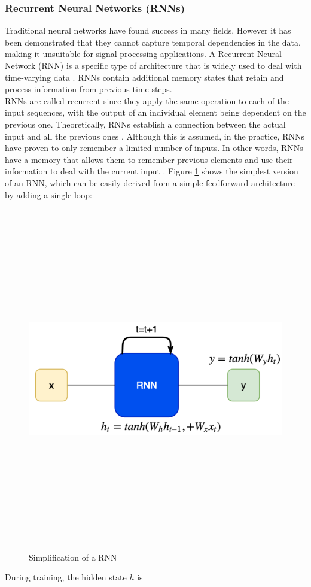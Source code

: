  \subsubsection{Recurrent Neural Networks (RNNs)}
 Traditional neural networks have found success in many fields, However
 it has been demonstrated that they cannot capture
 temporal dependencies in the data, making it unsuitable for signal processing applications. A Recurrent Neural Network (RNN) is a specific type of architecture that is 
 widely used to deal with time-varying data \cite{rnns}. RNNs contain additional memory states that retain and process information from previous
 time steps.\\ \newline \noindent RNNs are called recurrent since 
 they apply the same operation to each of the input sequences, with the output 
 of an individual element being dependent on the previous one. Theoretically, 
 RNNs establish a connection between the actual input and all the previous 
 ones \cite{rnns}. Although this is assumed, in the practice, RNNs have 
 proven to only remember a limited number of inputs. In other words, RNNs 
 have a memory that allows them to remember previous elements and use their 
 information to deal with the current 
 input \cite{deeplearning}. \noindent Figure \ref{rnn2} shows the simplest version 
of an RNN, which can be easily derived from a simple feedforward architecture by 
adding a single loop:
\begin{figure}[H]
    \centering
    \includegraphics[width=15cm,height=15cm,keepaspectratio]{Background/rnn2.png}
    \caption{Simplification of a RNN}
    \label{rnn2}
\end{figure} \noindent During training, the hidden state $h$ is 
